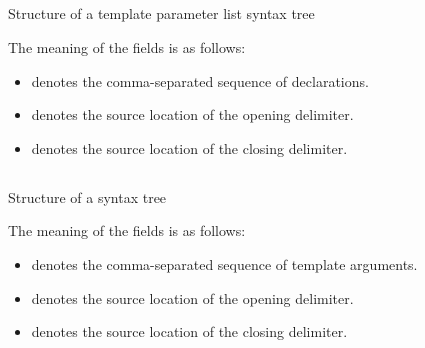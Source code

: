 

\subsection{}
\label{sec:ifc:SyntaxSort:TemplateParameterList}

\begin{Structure}
	\caption{Structure of a template parameter list syntax tree}
	\label{fig:ifc:SyntaxSort:TemplateParameterList}
\end{Structure}
%
The meaning of the fields is as follows:
\begin{itemize}
	\item {} denotes the comma-separated sequence of  declarations.
	\item {} denotes the source location of the opening \code{<} delimiter.
	\item {} denotes the source location of the closing \code{>} delimiter.
\end{itemize}



\subsection{}
\label{sec:ifc:SyntaxSort:TemplateArgumentList}

%
\begin{Structure}
	\caption{Structure of a  syntax tree}
	\label{fig:ifc:SyntaxSort:TemplateArgumentList}
\end{Structure}
%
The meaning of the fields is as follows:
\begin{itemize}
	\item {} denotes the comma-separated sequence of template arguments.
	\item {} denotes the source location of the opening \code{<} delimiter.
	\item {} denotes the source location of the closing \code{>} delimiter.
\end{itemize}

